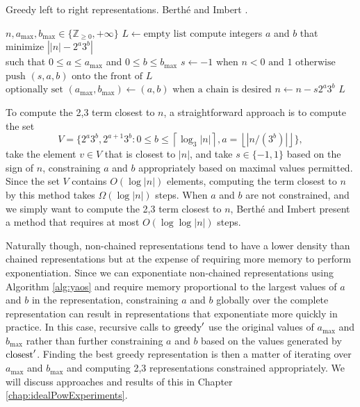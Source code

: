 \documentclass{ucalgthes1}
\theoremstyle{definition}
\newcommand{\ZZgez}{\mathbb{Z}_{\ge 0}}
\newcommand{\floor}[1]{\left\lfloor #1 \right\rfloor}
\newcommand{\ceil}[1]{\left\lceil #1 \right\rceil}
\newcommand{\amax}{a_\textrm{max}}
\newcommand{\bmax}{b_\textrm{max}}
\begin{document}
\begin{algorithm}[h]
\caption{Greedy left to right representations. Berth\'{e} and Imbert \cite{Berthe2009}.}
\label{alg:greedyltor}
\begin{algorithmic}[1]
\REQUIRE $n, \amax, \bmax \in \{\ZZgez, +\infty\}$ 
\STATE $L \gets \textrm{empty list}$
	\STATE compute integers $a$ and $b$ that minimize $\left||n| - 2^a3^b \right|$ \\
	       such that $0 \le a \le \amax$ and $0 \le b \le \bmax$
	\STATE $s \gets -1 \textrm{ when } n < 0 \textrm{ and } 1 \textrm{ otherwise}$
	\STATE $\textrm{push }(s, a, b) \textrm{ onto the front of } L$
	\STATE $\textrm{optionally set } (\amax, \bmax) \gets (a, b) \textrm{ when a chain is desired}$
	\STATE $n \gets n - s2^a3^b$
\ENDWHILE
\RETURN $L$
\end{algorithmic}
\end{algorithm}

To compute the 2,3 term closest to $n$, a straightforward approach is to compute the set 
\[
V = \{2^a3^b, 2^{a+1}3^b : 0 \le b \le \ceil{\log_3|n|}, a=\floor{|n/(3^b)|} \},
\]
take the element $v \in V$ that is closest to $|n|$, and take $s \in \{-1, 1\}$ based on the sign of $n$, constraining $a$ and $b$ appropriately based on maximal values permitted. Since the set $V$ contains $O(\log |n|)$ elements, computing the term closest to $n$ by this method takes $\Omega(\log |n|)$ steps.  When $a$ and $b$ are not constrained, and we simply want to compute the 2,3 term closest to $n$, Berth\'{e} and Imbert \cite{Berthe2009} present a method that requires at most $O(\log \log |n|)$ steps. 

Naturally though, non-chained representations tend to have a lower density than chained representations but at the expense of requiring more memory to perform exponentiation.  Since we can exponentiate non-chained representations using Algorithm \ref{alg:yaos} and require memory proportional to the largest values of $a$ and $b$ in the representation, constraining $a$ and $b$ globally over the complete representation can result in representations that exponentiate more quickly in practice. In this case, recursive calls to $\textrm{greedy}'$ use the original values of $\amax$ and $\bmax$ rather than further constraining $a$ and $b$ based on the values generated by $\textrm{closest}'$.  Finding the best greedy representation is then a matter of iterating over $\amax$ and $\bmax$ and computing 2,3 representations constrained appropriately.  We will discuss approaches and results of this in Chapter \ref{chap:idealPowExperiments}.
\end{document}
